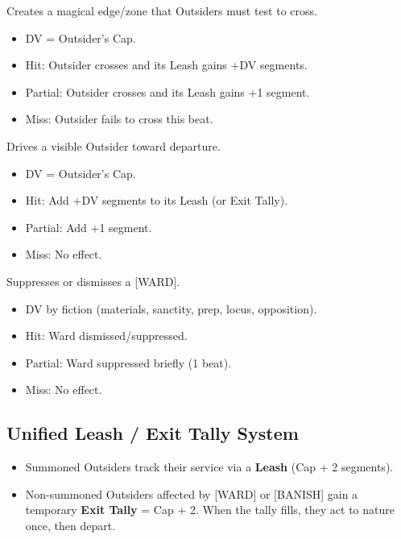 \begin{description}[leftmargin=1.5em, style=nextline]
  \item[WARD:] Creates a magical edge/zone that Outsiders must test to cross.
    \begin{itemize}
      \item DV = Outsider's Cap.
      \item Hit: Outsider crosses and its Leash gains +DV segments.
      \item Partial: Outsider crosses and its Leash gains +1 segment.
      \item Miss: Outsider fails to cross this beat.
    \end{itemize}
  \item[BANISH:] Drives a visible Outsider toward departure.
    \begin{itemize}
      \item DV = Outsider's Cap.
      \item Hit: Add +DV segments to its Leash (or Exit Tally).
      \item Partial: Add +1 segment.
      \item Miss: No effect.
    \end{itemize}
  \item[UNWARD:] Suppresses or dismisses a [WARD].
    \begin{itemize}
      \item DV by fiction (materials, sanctity, prep, locus, opposition).
      \item Hit: Ward dismissed/suppressed.
      \item Partial: Ward suppressed briefly (1 beat).
      \item Miss: No effect.
    \end{itemize}
\end{description}

\subsection{Unified Leash / Exit Tally System}
\begin{itemize}
  \item Summoned Outsiders track their service via a \textbf{Leash} (Cap + 2 segments).
  \item Non-summoned Outsiders affected by [WARD] or [BANISH] gain a temporary \textbf{Exit Tally} = Cap + 2. When the tally fills, they act to nature once, then depart.
\end{itemize}

